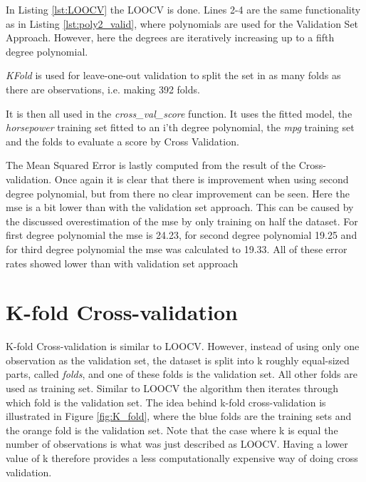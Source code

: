 In Listing \ref{lst:LOOCV} the LOOCV is done. Lines 2-4 are the same functionality as in Listing \ref{lst:poly2_valid}, where polynomials are used for the Validation Set Approach. However, here the degrees are iteratively increasing up to a fifth degree polynomial.

\emph{KFold} is used for leave-one-out validation to split the set in as many folds as there are observations, i.e. making 392 folds.

It is then all used in the \emph{cross\_val\_score} function. It uses the fitted model, the \emph{horsepower} training set fitted to an i'th degree polynomial, the \emph{mpg} training set and the folds to evaluate a score by Cross Validation.



The Mean Squared Error is lastly computed from the result of the Cross-validation. Once again it is clear that there is improvement when using second degree polynomial, but from there no clear improvement can be seen. Here the mse is a bit lower than with the validation set approach. This can be caused by the discussed overestimation of the mse by only training on half the dataset. For first degree polynomial the mse is 24.23, for second degree polynomial 19.25 and for third degree polynomial the mse was calculated to 19.33. All of these error rates showed lower than with validation set approach


\section{K-fold Cross-validation}
K-fold Cross-validation is similar to LOOCV. However, instead of using only one observation as the validation set, the dataset is split into k roughly equal-sized parts, called \emph{folds}, and one of these folds is the validation set. All other folds are used as training set. Similar to LOOCV the algorithm then iterates through which fold is the validation set. The idea behind k-fold cross-validation is illustrated in Figure \ref{fig:K_fold}, where the blue folds are the training sets and the orange fold is the validation set. Note that the case where k is equal the number of observations is what was just described as LOOCV. Having a lower value of k therefore provides a less computationally expensive way of doing cross validation.

